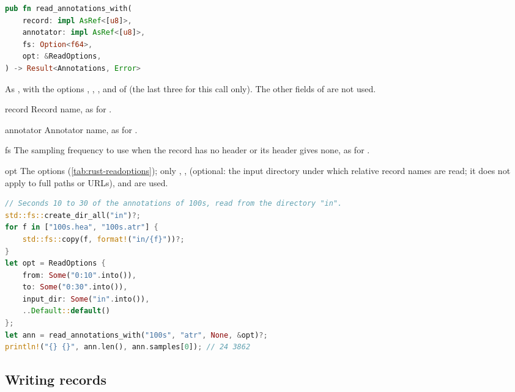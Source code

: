 \begin{lstlisting}[language=Rust,style=signature]
pub fn read_annotations_with(
    record: impl AsRef<[u8]>,
    annotator: impl AsRef<[u8]>,
    fs: Option<f64>,
    opt: &ReadOptions,
) -> Result<Annotations, Error>
\end{lstlisting}
As , with the options , , ,
 and  of  (the last three for this call only). The
other fields of  are not used.
\begin{params}
\item[record] Record name, as for .
\item[annotator] Annotator name, as for .
\item[fs] The sampling frequency to use when the record has no header or its header
  gives none, as for .
\item[opt] The options (\cref{tab:rust-readoptions}); only , ,
   (optional: the input directory under which relative record names are
  read; it does not apply to full paths or URLs),  and  are
  used.
\end{params}
\begin{lstlisting}[language=Rust,style=example]
// Seconds 10 to 30 of the annotations of 100s, read from the directory "in".
std::fs::create_dir_all("in")?;
for f in ["100s.hea", "100s.atr"] {
    std::fs::copy(f, format!("in/{f}"))?;
}
let opt = ReadOptions {
    from: Some("0:10".into()),
    to: Some("0:30".into()),
    input_dir: Some("in".into()),
    ..Default::default()
};
let ann = read_annotations_with("100s", "atr", None, &opt)?;
println!("{} {}", ann.len(), ann.samples[0]); // 24 3862
\end{lstlisting}

\subsection{Writing records}
\label{sec:rust-writing}

